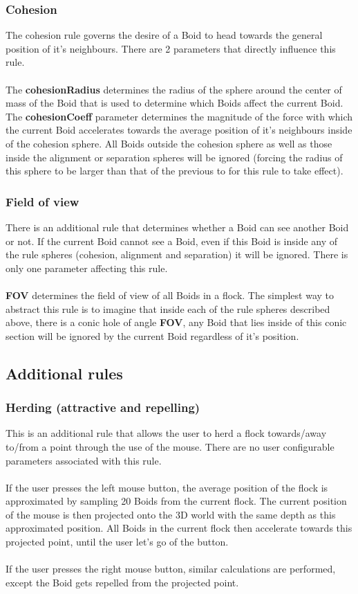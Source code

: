 \documentclass[12pt]{article}
\begin{document}
\subsubsection{Cohesion}
The cohesion rule governs the desire of a Boid to head towards the general position of it's neighbours. There are 2 parameters that directly influence this rule.
\\ \\
The \textbf{cohesionRadius} determines the radius of the sphere around the center of mass of the Boid that is used to determine which Boids affect the current Boid. The \textbf{cohesionCoeff} parameter determines the magnitude of the force with which the current Boid  accelerates towards the average position of it's neighbours inside of the cohesion sphere. All Boids outside the cohesion sphere as well as those inside the alignment or separation spheres will be ignored (forcing the radius of this sphere to be larger than that of the previous to for this rule to take effect).

\subsubsection{Field of view}
There is an additional rule that determines whether a Boid can see another Boid or not. If the current Boid cannot see a Boid, even if this Boid is inside any of the rule spheres (cohesion, alignment and separation) it will be ignored. There is only one parameter affecting this rule.
\\ \\
\textbf{FOV} determines the field of view of all Boids in a flock. The simplest way to abstract this rule is to imagine that inside each of the rule spheres described above, there is a conic hole of angle \textbf{FOV}, any Boid that lies inside of this conic section will be ignored by the current Boid regardless of it's position.

\subsection{Additional rules}
\subsubsection{Herding (attractive and repelling)}
This is an additional rule that allows the user to herd a flock towards/away to/from a point through the use of the mouse. There are no user configurable parameters associated with this rule.
\\ \\
If the user presses the left mouse button, the average position of the flock is approximated by sampling 20 Boids from the current flock. The current position of the mouse is then projected onto the 3D world with the same depth as this approximated position. All Boids in the current flock then accelerate towards this projected point, until the user let's go of the button.
\\ \\
If the user presses the right mouse button, similar calculations are performed, except the Boid gets repelled from the projected point.
\end{document}
